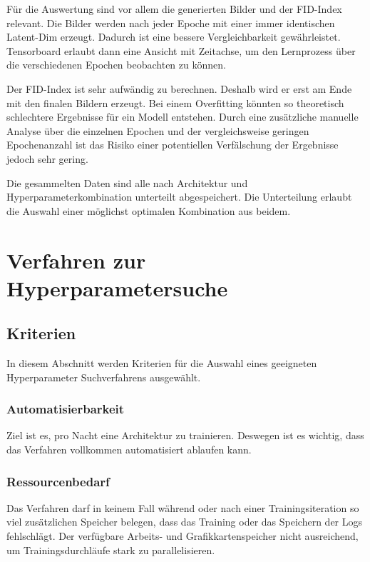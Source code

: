 Für die Auswertung sind vor allem die generierten Bilder und der \acrshort{FID}-Index relevant.
Die Bilder werden nach jeder Epoche mit einer immer identischen Latent-Dim erzeugt.
Dadurch ist eine bessere Vergleichbarkeit gewährleistet.
Tensorboard erlaubt dann eine Ansicht mit Zeitachse, um den Lernprozess über die verschiedenen Epochen beobachten zu können.
\newline

Der \acrshort{FID}-Index ist sehr aufwändig zu berechnen.
Deshalb wird er erst am Ende mit den finalen Bildern erzeugt.
Bei einem Overfitting könnten so theoretisch schlechtere Ergebnisse für ein Modell entstehen.
Durch eine zusätzliche manuelle Analyse über die einzelnen Epochen und der vergleichsweise geringen Epochenanzahl ist das Risiko einer potentiellen Verfälschung der Ergebnisse jedoch sehr gering.
\newline

Die gesammelten Daten sind alle nach Architektur und Hyperparameterkombination unterteilt abgespeichert.
Die Unterteilung erlaubt die Auswahl einer möglichst optimalen Kombination aus beidem.

\section{Verfahren zur Hyperparametersuche}

\subsection{Kriterien}
In diesem Abschnitt werden Kriterien für die Auswahl eines geeigneten Hyperparameter Suchverfahrens ausgewählt.

\subsubsection{Automatisierbarkeit}
Ziel ist es, pro Nacht eine Architektur zu trainieren.
Deswegen ist es wichtig, dass das Verfahren vollkommen automatisiert ablaufen kann.

\subsubsection{Ressourcenbedarf}
Das Verfahren darf in keinem Fall während oder nach einer Trainingsiteration so viel zusätzlichen Speicher belegen, dass das Training oder das Speichern der Logs fehlschlägt.
Der verfügbare Arbeits- und Grafikkartenspeicher nicht ausreichend, um Trainingsdurchläufe stark zu parallelisieren.

